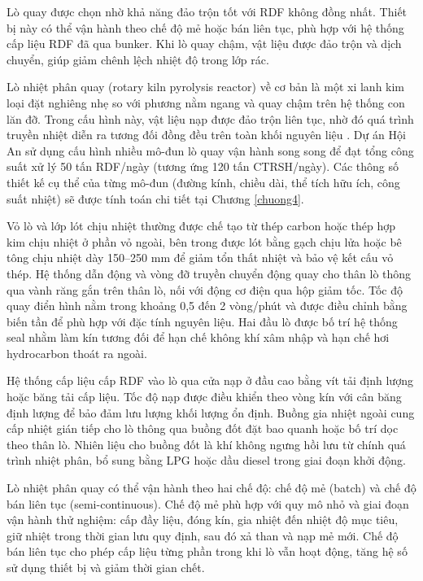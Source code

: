 \documentclass[../main.tex]{subfiles}
\begin{document}
Lò quay được chọn nhờ khả năng đảo trộn tốt với RDF không đồng nhất. Thiết bị này có thể vận hành theo chế độ mẻ hoặc bán liên tục, phù hợp với hệ thống cấp liệu RDF đã qua bunker. Khi lò quay chậm, vật liệu được đảo trộn và dịch chuyển, giúp giảm chênh lệch nhiệt độ trong lớp rác.

Lò nhiệt phân quay (rotary kiln pyrolysis reactor) về cơ bản là một xi lanh kim loại đặt nghiêng nhẹ so với phương nằm ngang và quay chậm trên hệ thống con lăn đỡ. Trong cấu hình này, vật liệu nạp được đảo trộn liên tục, nhờ đó quá trình truyền nhiệt diễn ra tương đối đồng đều trên toàn khối nguyên liệu \cite{Boateng2008}. Dự án Hội An sử dụng cấu hình nhiều mô-đun lò quay vận hành song song để đạt tổng công suất xử lý 50 tấn RDF/ngày (tương ứng 120 tấn CTRSH/ngày). Các thông số thiết kế cụ thể của từng mô-đun (đường kính, chiều dài, thể tích hữu ích, công suất nhiệt) sẽ được tính toán chi tiết tại Chương \ref{chuong4}.

Vỏ lò và lớp lót chịu nhiệt thường được chế tạo từ thép carbon hoặc thép hợp kim chịu nhiệt ở phần vỏ ngoài, bên trong được lót bằng gạch chịu lửa hoặc bê tông chịu nhiệt dày 150--250 mm để giảm tổn thất nhiệt và bảo vệ kết cấu vỏ thép. Hệ thống dẫn động và vòng đỡ truyền chuyển động quay cho thân lò thông qua vành răng gắn trên thân lò, nối với động cơ điện qua hộp giảm tốc. Tốc độ quay điển hình nằm trong khoảng 0,5 đến 2 vòng/phút và được điều chỉnh bằng biến tần để phù hợp với đặc tính nguyên liệu. Hai đầu lò được bố trí hệ thống seal nhằm làm kín tương đối để hạn chế không khí xâm nhập và hạn chế hơi hydrocarbon thoát ra ngoài.

Hệ thống cấp liệu cấp RDF vào lò qua cửa nạp ở đầu cao bằng vít tải định lượng hoặc băng tải cấp liệu. Tốc độ nạp được điều khiển theo vòng kín với cân băng định lượng để bảo đảm lưu lượng khối lượng ổn định. Buồng gia nhiệt ngoài cung cấp nhiệt gián tiếp cho lò thông qua buồng đốt đặt bao quanh hoặc bố trí dọc theo thân lò. Nhiên liệu cho buồng đốt là khí không ngưng hồi lưu từ chính quá trình nhiệt phân, bổ sung bằng LPG hoặc dầu diesel trong giai đoạn khởi động.

Lò nhiệt phân quay có thể vận hành theo hai chế độ: chế độ mẻ (batch) và chế độ bán liên tục (semi-continuous). Chế độ mẻ phù hợp với quy mô nhỏ và giai đoạn vận hành thử nghiệm: cấp đầy liệu, đóng kín, gia nhiệt đến nhiệt độ mục tiêu, giữ nhiệt trong thời gian lưu quy định, sau đó xả than và nạp mẻ mới. Chế độ bán liên tục cho phép cấp liệu từng phần trong khi lò vẫn hoạt động, tăng hệ số sử dụng thiết bị và giảm thời gian chết.
\end{document}
